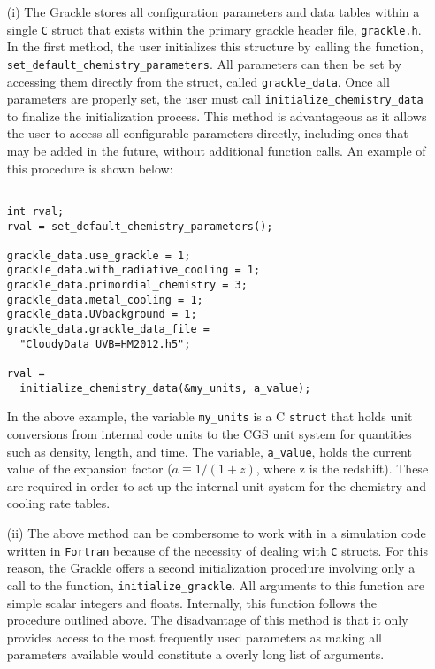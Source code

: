 \begin{enumerate}
\item[(i)] The Grackle stores all configuration parameters and data
  tables within a single \texttt{C} struct that exists within the
  primary grackle header file, \texttt{grackle.h}.  In the first
  method, the user initializes this structure by calling the function,
  \texttt{set\_default\_chemistry\_parameters}.  All parameters can
  then be set by accessing them directly from the struct, called
  \texttt{grackle\_data}.  Once all parameters are properly set, the
  user must call \texttt{initialize\_chemistry\_data} to finalize the
  initialization process.  This method is advantageous as it allows
  the user to access all configurable parameters directly, including
  ones that may be added in the future, without additional function
  calls.  An example of this procedure is shown below:

\vspace{0.5cm}
\begin{minipage}[b]{0.5\linewidth}
\begin{verbatim}

int rval;
rval = set_default_chemistry_parameters();

grackle_data.use_grackle = 1;
grackle_data.with_radiative_cooling = 1;
grackle_data.primordial_chemistry = 3;
grackle_data.metal_cooling = 1;
grackle_data.UVbackground = 1;
grackle_data.grackle_data_file = 
  "CloudyData_UVB=HM2012.h5";

rval = 
  initialize_chemistry_data(&my_units, a_value);

\end{verbatim}
\end{minipage}

In the above example, the variable \texttt{my\_units} is a C
\texttt{struct} that holds unit conversions from internal code units
to the CGS unit system for quantities such as density, length, and
time.  The variable, \texttt{a\_value}, holds the current value of the
expansion factor ($a \equiv 1/(1+z)$, where z is the redshift).  These
are required in order to set up the internal unit system for the
chemistry and cooling rate tables.

\item[(ii)] The above method can be combersome to work with in a
  simulation code written in \texttt{Fortran} because of the necessity
  of dealing with \texttt{C} structs.  For this reason, the Grackle
  offers a second initialization procedure involving only a call to
  the function, \texttt{initialize\_grackle}.  All arguments to this
  function are simple scalar integers and floats.  Internally, this
  function follows the procedure outlined above.  The disadvantage of
  this method is that it only provides access to the most frequently
  used parameters as making all parameters available would constitute
  a overly long list of arguments.

\end{enumerate}


